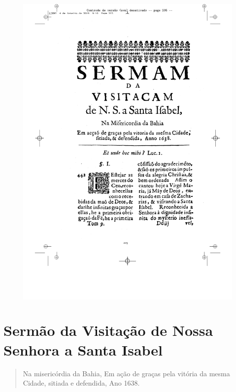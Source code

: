 \pagebreak
\thispagestyle{empty}
\movetoevenpage
\begin{figure}
\includegraphics[width=\textwidth]{./imgs/visitacao.pdf}  
\end{figure}

\chapter[Sermão da Visitação de Nossa Senhora a Santa Isabel]{Sermão da Visitação de Nossa\\ Senhora a Santa Isabel}

\begin{quotation}
\noindent{}Na misericórdia da Bahia,
Em ação de graças pela vitória da mesma Cidade,
sitiada e defendida, Ano 1638.
\end{quotation}


